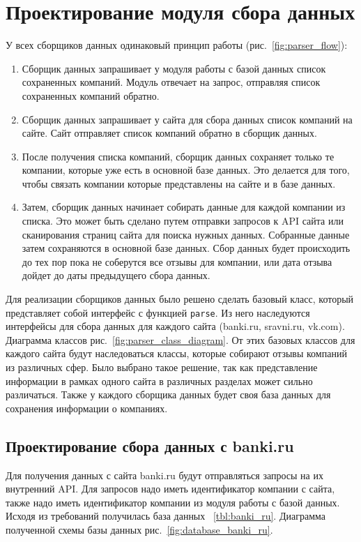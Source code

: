 \documentclass[PI, VKR]{HSEUniversity}
\begin{document}
\section{Проектирование модуля сбора данных}
\label{sec:orgfe70059}
У всех сборщиков данных одинаковый принцип работы (рис.~\ref{fig:parser_flow}):
\begin{enumerate}
\item Сборщик данных запрашивает у модуля работы с базой данных список сохраненных компаний. Модуль отвечает на запрос, отправляя список сохраненных компаний обратно.
\item Сборщик данных запрашивает у сайта для сбора данных список компаний на сайте. Сайт отправляет список компаний обратно в сборщик данных.
\item После получения списка компаний, сборщик данных сохраняет только те компании, которые уже есть в основной базе данных. Это делается для того, чтобы связать компании которые представлены на сайте и в базе данных.
\item Затем, сборщик данных начинает собирать данные для каждой компании из списка. Это может быть сделано путем отправки запросов к API сайта или сканирования страниц сайта для поиска нужных данных. Собранные данные затем сохраняются в основной базе данных. Сбор данных будет происходить до тех пор пока не соберутся все отзывы для компании, или дата отзыва дойдет до даты предыдущего сбора данных.
\end{enumerate}

Для реализации сборщиков данных было решено сделать базовый класс, который представляет собой интерфейс с функцией \texttt{parse}. Из него наследуются интерфейсы для сбора данных для каждого сайта (banki.ru, sravni.ru, vk.com). Диаграмма классов рис.~\ref{fig:parser_class_diagram}. От этих базовых классов для каждого сайта будут наследоваться классы, которые собирают отзывы компаний из различных сфер. Было выбрано такое решение, так как представление информации в рамках одного сайта в различных разделах может сильно различаться. Также у каждого сборщика данных будет своя база данных для сохранения информации о компаниях.

\subsection{Проектирование сбора данных с banki.ru}
\label{sec:org5036a1a}
Для получения данных с сайта banki.ru будут отправляться запросы на их внутренний API. Для запросов надо иметь идентификатор компании с сайта, также надо иметь идентификатор компании из модуля работы с базой данных. Исходя из требований получилась база данных ~\ref{tbl:banki_ru}. Диаграмма полученной схемы базы данных рис.~\ref{fig:database_banki_ru}.
\end{document}
